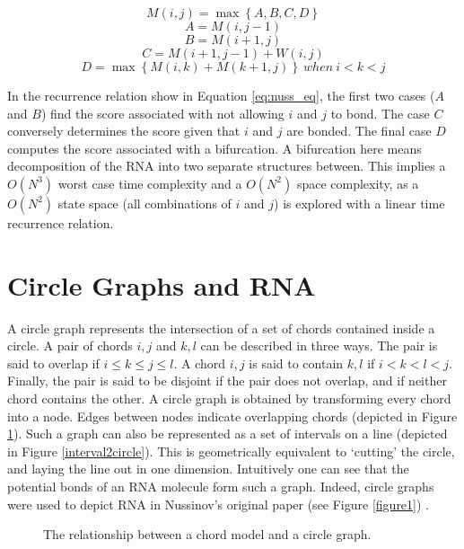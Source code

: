 \documentclass[12pt, a4paper]{article}
\begin{document}
\begin{equation} \label{eq:nuss_eq}
	M(i, j) = \max \left\lbrace A, B, C, D \right\rbrace 
\end{equation}
\[
A = M(i, j-1)
\]
\[
B = M(i+1, j)
\]
\[
C = M(i+1, j-1) + W(i, j)
\]
\[
D = \max \left\lbrace M(i, k) + M(k+1, j) \right\rbrace \: when \: i < k < j
\]


In the recurrence relation show in Equation \ref{eq:nuss_eq}, the first two cases ($A$ and $B$) find the score associated with not allowing $i$ and $j$ to bond. The case $C$ conversely determines the score given that $i$ and $j$ are bonded. The final case $D$ computes the score associated with a bifurcation. A bifurcation here means decomposition of the RNA into two separate structures between. This implies a $O(N^3)$
worst case time complexity and a $O(N^2)$ space complexity, as a $O(N^2)$ state space (all combinations of $i$ and $j$) is explored
with a linear time recurrence relation.



\section*{Circle Graphs and RNA}
A circle graph represents the intersection of a set of chords contained inside a circle.
A pair of chords $i, j$ and $k, l$ can be described in three ways. The pair is said to overlap if $i \leq k \leq j \leq l$. A chord $i, j$ is said to contain $k, l$ if $i < k < l < j$. Finally, the pair is said to be disjoint if the pair does not overlap, and if neither chord contains the other. A circle graph is obtained by transforming every chord into a node. Edges between nodes indicate overlapping chords (depicted in Figure \ref{circle2graph}). Such a graph can also be represented as a set of intervals on a line (depicted in Figure \ref{interval2circle}). This is geometrically equivalent to `cutting' the circle, and laying the line out in one dimension. Intuitively one can see that the potential bonds of an RNA molecule form such a graph. Indeed, circle graphs were used to depict RNA in Nussinov's original paper (see Figure \ref{figure1}) \cite{nussinov1980fast}.

\begin{figure}
\begin{center}
\end{center}
\caption{The relationship between a chord model and a circle graph.}
\label{circle2graph}
\end{figure}
\end{document}
